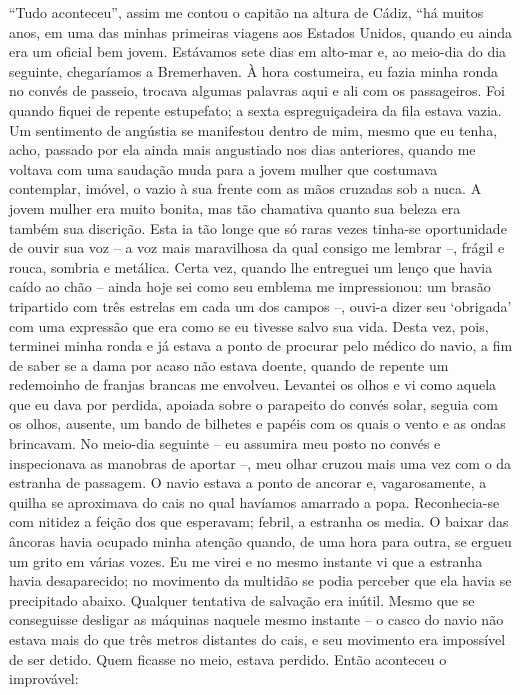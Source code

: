 ``Tudo aconteceu'', assim me contou o capitão na altura de Cádiz, ``há
muitos anos, em uma das minhas primeiras viagens aos Estados Unidos,
quando eu ainda era um oficial bem jovem. Estávamos sete dias em
alto-mar e, ao meio-dia do dia seguinte, chegaríamos a Bremerhaven. À
hora costumeira, eu fazia minha ronda no convés de passeio, trocava
algumas palavras aqui e ali com os passageiros. Foi quando fiquei de
repente estupefato; a sexta espreguiçadeira da fila estava vazia. Um
sentimento de angústia se manifestou dentro de mim, mesmo que eu tenha,
acho, passado por ela ainda mais angustiado nos dias anteriores, quando
me voltava com uma saudação muda para a jovem mulher que costumava
contemplar, imóvel, o vazio à sua frente com as mãos cruzadas
sob a nuca. A jovem mulher era muito bonita, mas tão chamativa quanto
sua beleza era também sua discrição. Esta ia tão longe que só raras
vezes tinha-se oportunidade de ouvir sua voz -- a voz mais maravilhosa
da qual consigo me lembrar --, frágil e rouca, sombria e metálica. Certa
vez, quando lhe entreguei um lenço que havia caído ao chão -- ainda hoje
sei como seu emblema me impressionou: um brasão tripartido com três
estrelas em cada um dos campos --, ouvi-a dizer seu `obrigada' com uma
expressão que era como se eu tivesse salvo sua vida. Desta vez, pois,
terminei minha ronda e já estava a ponto de procurar pelo médico do
navio, a fim de saber se a dama por acaso não estava doente, quando de
repente um redemoinho de franjas brancas me envolveu. Levantei os olhos
e vi como aquela que eu dava por perdida, apoiada sobre o parapeito do
convés solar, seguia com os olhos, ausente, um bando de bilhetes e
papéis com os quais o vento e as ondas brincavam. No meio-dia seguinte
-- eu assumira meu posto no convés e inspecionava as manobras de aportar
--, meu olhar cruzou mais uma vez com o da estranha de passagem. O navio
estava a ponto de ancorar e, vagarosamente, a quilha se aproximava do
cais no qual havíamos amarrado a popa. Reconhecia-se com nitidez a
feição dos que esperavam; febril, a estranha os media. O baixar das
âncoras havia ocupado minha atenção quando, de uma hora para outra, se
ergueu um grito em várias vozes. Eu me virei e no mesmo instante vi que
a estranha havia desaparecido; no movimento da multidão se podia
perceber que ela havia se precipitado abaixo. Qualquer tentativa de
salvação era inútil. Mesmo que se conseguisse desligar as máquinas
naquele mesmo instante -- o casco do navio não estava mais do que três
metros distantes do cais, e seu movimento era impossível de ser detido.
Quem ficasse no meio, estava perdido. Então aconteceu o improvável:
